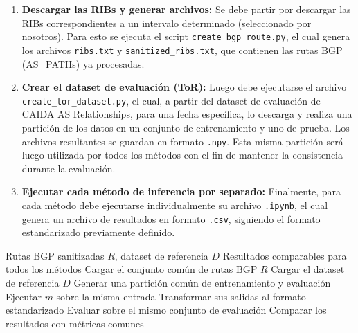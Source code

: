 \begin{enumerate}
    \item \textbf{Descargar las RIBs y generar archivos:} 
    Se debe partir por descargar las RIBs correspondientes a un intervalo determinado (seleccionado por nosotros). Para esto se ejecuta el script \texttt{create\_bgp\_route.py}, el cual genera los archivos \texttt{ribs.txt} y \texttt{sanitized\_ribs.txt}, que contienen las rutas BGP (AS\_PATHs) ya procesadas.
    
    \item \textbf{Crear el dataset de evaluación (ToR):}  
    Luego debe ejecutarse el archivo \texttt{create\_tor\_dataset.py}, el cual, a partir del dataset de evaluación de CAIDA AS Relationships, para una fecha específica, lo descarga y realiza una partición de los datos en un conjunto de entrenamiento y uno de prueba. Los archivos resultantes se guardan en formato \texttt{.npy}. Esta misma partición será luego utilizada por todos los métodos con el fin de mantener la consistencia durante la evaluación.


    \item \textbf{Ejecutar cada método de inferencia por separado:}  
    Finalmente, para cada método debe ejecutarse individualmente su archivo \texttt{.ipynb}, el cual genera un archivo de resultados en formato \texttt{.csv}, siguiendo el formato estandarizado previamente definido.    
\end{enumerate}



\begin{algorithm}[H]
\caption{Flujo general del benchmark experimental}
\label{alg:flujo_benchmark}
\begin{algorithmic}[1]
\Require Rutas BGP sanitizadas $R$, dataset de referencia $D$
\Ensure Resultados comparables para todos los métodos
\State Cargar el conjunto común de rutas BGP $R$
\State Cargar el dataset de referencia $D$
\State Generar una partición común de entrenamiento y evaluación
    \State Ejecutar $m$ sobre la misma entrada
    \State Transformar sus salidas al formato estandarizado
    \State Evaluar sobre el mismo conjunto de evaluación
\EndFor
\State Comparar los resultados con métricas comunes
\end{algorithmic}
\end{algorithm}


















